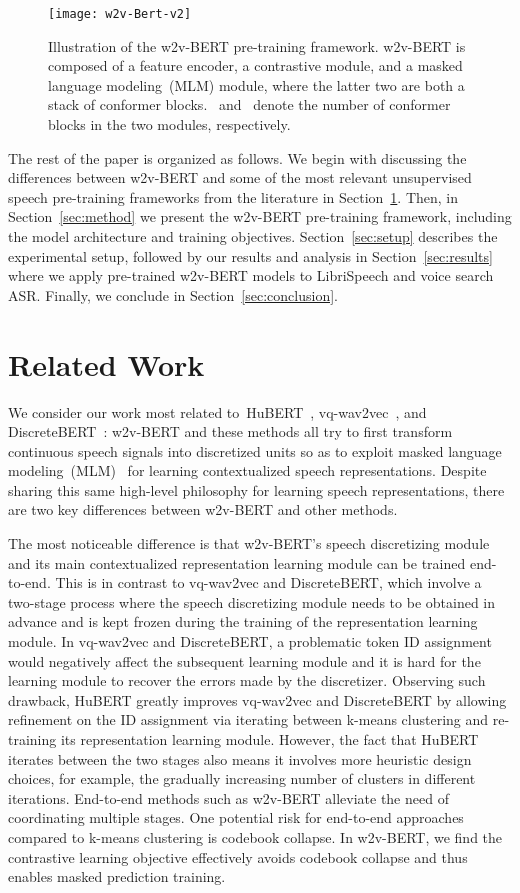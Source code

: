 \documentclass{article}
\begin{document}
\begin{figure}[htbp]
  \centering
  \texttt{[image: w2v-Bert-v2]}
  \caption{Illustration of the w2v-BERT pre-training framework. w2v-BERT is composed of a feature encoder, a contrastive module, and a masked language modeling~(MLM) module, where the latter two are both a stack of conformer blocks.~ and~ denote the number of conformer blocks in the two modules, respectively.}
  \label{fig:model}
\end{figure}

The rest of the paper is organized as follows.
We begin with discussing the differences between w2v-BERT and some of the most relevant unsupervised speech pre-training frameworks from the literature in Section~\ref{sec:related}.
Then, in Section~\ref{sec:method} we present the w2v-BERT pre-training framework, including the model architecture and training objectives.
Section~\ref{sec:setup} describes the experimental setup, followed by our results and analysis in Section~\ref{sec:results} where we apply pre-trained w2v-BERT models to LibriSpeech and voice search ASR.
Finally, we conclude in Section~\ref{sec:conclusion}.


\section{Related Work}
\label{sec:related}
We consider our work most related to~HuBERT~\cite{hsu2021hubert}, vq-wav2vec~\cite{baevski2020vq}, and DiscreteBERT~\cite{baevski2019effectiveness}: w2v-BERT and these methods all try to first transform continuous speech signals into discretized units so as to exploit masked language modeling~(MLM)~\cite{devlin2019bert} for learning contextualized speech representations.
Despite sharing this same high-level philosophy for learning speech representations, there are two key differences between w2v-BERT and other methods.

The most noticeable difference is that w2v-BERT's speech discretizing module and its main contextualized representation learning module can be trained end-to-end.
This is in contrast to vq-wav2vec and DiscreteBERT, which involve a two-stage process where the speech discretizing module needs to be obtained in advance and is kept frozen during the training of the representation learning module.
In vq-wav2vec and DiscreteBERT, a problematic token ID assignment would negatively affect the subsequent learning module and it is hard for the learning module to recover the errors made by the discretizer.
Observing such drawback, HuBERT greatly improves vq-wav2vec and DiscreteBERT by allowing refinement on the ID assignment via iterating between k-means clustering and re-training its representation learning module. 
However, the fact that HuBERT iterates between the two stages also means it involves more heuristic design choices, for example, the gradually increasing number of clusters in different iterations.
End-to-end methods such as w2v-BERT alleviate the need of coordinating multiple stages.
One potential risk for end-to-end approaches compared to k-means clustering is codebook collapse.
In w2v-BERT, we find the contrastive learning objective effectively avoids codebook collapse and thus enables masked prediction training.
\end{document}
